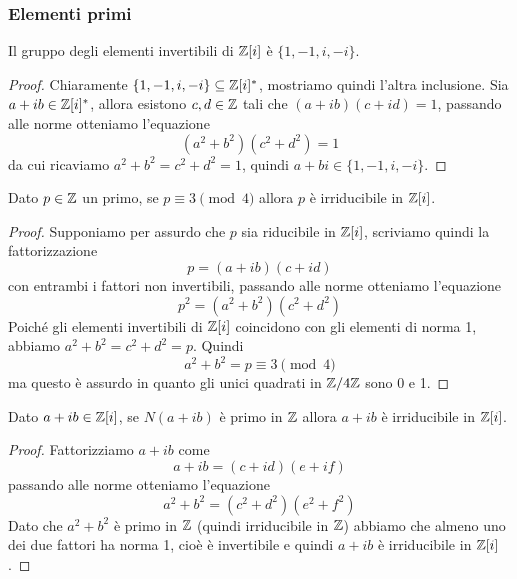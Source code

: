 \documentclass[11pt]{scrartcl}
\begin{document}
\subsubsection{Elementi primi}

\begin{lemma}
    Il gruppo degli elementi invertibili di $\mathbb Z[i]$ è $\{1, -1, i, -i\}$.
\end{lemma}

\begin{proof}
    Chiaramente $\{1, -1, i, -i\} \subseteq \mathbb Z[i]^*$, mostriamo quindi l'altra
    inclusione. Sia $a + ib \in \mathbb Z[i]^*$, allora esistono $c, d \in \mathbb Z$
    tali che $(a + ib)(c + id) = 1$, passando alle norme otteniamo l'equazione
    \[
        (a^2 + b^2)(c^2 + d^2) = 1
    \]
    da cui ricaviamo $a^2 + b^2 = c^2 + d^2 = 1$, quindi $a + bi \in \{1, -1, i, -i\}$.
\end{proof}

\begin{lemma}
    \label{lemma2.13}
    Dato $p \in \mathbb Z$ un primo, se $p \equiv 3 \pmod 4$ allora $p$ è irriducibile
    in $\mathbb Z[i]$.
\end{lemma}

\begin{proof}
    Supponiamo per assurdo che $p$ sia riducibile in $\mathbb Z[i]$, scriviamo quindi
    la fattorizzazione
    \[
        p = (a + ib)(c + id)
    \]
    con entrambi i fattori non invertibili, passando alle norme otteniamo 
    l'equazione
    \[
        p^2 = (a^2 + b^2)(c^2 + d^2)
    \]
    Poiché gli elementi invertibili di $\mathbb Z[i]$ coincidono con gli elementi di 
    norma 1, abbiamo $a^2 + b^2 = c^2 + d^2 = p$. Quindi 
    \[
        a^2 + b^2 = p \equiv 3 \pmod 4
    \]
    ma questo è assurdo in quanto gli unici quadrati in $\mathbb{Z}/{4}\mathbb{Z}$ sono 0 e 1.
\end{proof}

\begin{lemma}
    \label{lemma2.14}
    Dato $a + ib \in \mathbb Z[i]$, se $N(a + ib)$ è primo in $\mathbb Z$ allora $a + ib$
    è irriducibile in $\mathbb Z[i]$.
\end{lemma}

\begin{proof}
    Fattorizziamo $a + ib$ come 
    \[
        a + ib = (c + id)(e + if)
    \]
    passando alle norme otteniamo l'equazione
    \[
        a^2 + b^2 = (c^2 + d^2)(e^2 + f^2)
    \]
    Dato che $a^2 + b^2$ è primo in $\mathbb Z$ (quindi irriducibile in $\mathbb Z$)
    abbiamo che almeno uno dei due fattori ha norma 1, cioè è invertibile e 
    quindi $a + ib$ è irriducibile in $\mathbb Z[i]$.
\end{proof}
\end{document}
